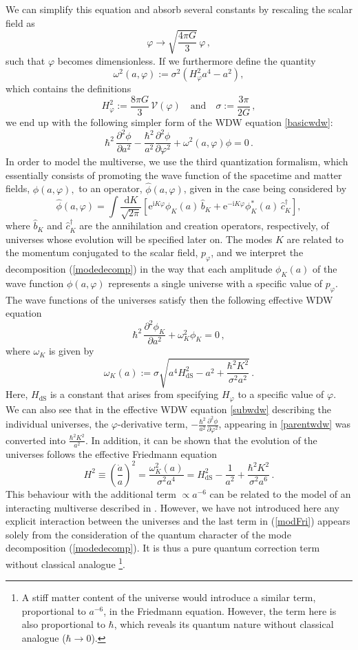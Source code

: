\documentclass[aps,nofootinbib,prd,superscriptaddress,eqsecnum,showpacs,showkeys,preprintnumbers,altaffilletter]{revtex4}
\def\D{\mathrm{d}}
\def\I{\mathrm{i}}
\def\E{\mathrm{e}}
\def\del{\partial}
\def\be{\begin{equation}}
\def\ee{\end{equation}}
\newcommand{\HdS}{H_\mathrm{dS}}
\begin{document}
We can simplify this equation and absorb several constants by rescaling the scalar field as 
\be
\varphi \rightarrow \sqrt{\frac{4\pi G}{3}} \,\varphi\,,
\ee
such that $\varphi$ becomes dimensionless. If we furthermore define the quantity
\be
\omega^2(a,\varphi) := \sigma^2 \left(H_\varphi^2 a^4 - a^2\right),
\ee
which contains the definitions
\be
\label{sigma_def}
H_\varphi^2 := \frac{8 \pi G}{3}\,\mathcal{V}(\varphi) \quad \text{and} \quad \sigma := \frac{3 \pi}{2 G}\,,
\ee
we end up with the following simpler form of the WDW equation \eqref{basicwdw}:
\be
\label{parentwdw}
\hbar^2\,\frac{\del^2\phi}{\del a^2} - \frac{\hbar^2}{a^2} \frac{\del^2 \phi}{\del \varphi^2} + \omega^2(a,\varphi) \phi = 0\,.
\ee
In order to model the multiverse, we use the third quantization formalism, which essentially consists of promoting the wave function of the spacetime and matter fields, $\phi(a,\varphi), $ to an operator, $\hat{\phi}(a,\varphi) $, given in the case being considered by 
\be\label{modedecomp}
\hat{\phi}(a,\varphi) = \int \frac{\D K}{\sqrt{2\pi}} 
\left[\E^{\I K \varphi} \phi_K(a) \, \hat{b}_{K} + \E^{-\I K \varphi} \phi_K^*(a) \, \hat{c}^\dag_{K}\right],
\ee
where $\hat{b}_{K}$ and $\hat{c}^\dag_{K}$ are the annihilation and creation operators, respectively, of universes whose evolution will be specified later on. The modes $K$ are related to the momentum conjugated to the scalar field, $p_\varphi$, and we interpret the decomposition (\ref{modedecomp}) in the way that each amplitude $\phi_K(a)$ of the  wave function $\phi(a,\varphi)$ represents a single universe with a specific value of $p_\varphi$. The wave functions of the universes satisfy then the following effective WDW equation
\be \label{subwdw}
\hbar^2\,\frac{\del^2\phi_K}{\del a^2} + \omega_K^2 \phi_K = 0\,,
\ee
where $\omega_K$ is given by
\be \label{omk}
\omega_K(a) := \sigma \sqrt{a^4 \HdS^2 - a^2 + \frac{\hbar^2 K^2}{\sigma^2 a^2}}\,.
\ee
Here, $\HdS$ is a constant that arises from specifying $H_\varphi$ to a specific value of $\varphi$. We can also see that in the effective WDW equation \eqref{subwdw} describing the individual universes, the $\varphi$-derivative term, $- \frac{\hbar^2}{a^2} \frac{\del^2 \phi}{\del \varphi^2}$, appearing in \eqref{parentwdw} was converted into $\frac{\hbar^2 K^2}{a^2}$. In addition, it can be shown that the evolution of the universes follows the effective Friedmann equation \cite{salva2011,Garay:2013pba}
\be \label{modFri}
H^2 \equiv \left(\frac{\dot a}{a}\right)^2 = \frac{\omega^2_K(a)}{\sigma^2a^4} = \HdS^2 - \frac{1}{a^2} + \frac{\hbar^2 K^2}{\sigma^2 a^6}\,.
\ee
This behaviour with the additional term $\propto a^{-6}$ can be related to the model of an interacting multiverse described in \cite{salva2015}. However, we have not introduced here any explicit interaction between the universes and the last term in (\ref{modFri}) appears solely from the consideration of the quantum character of the mode decomposition (\ref{modedecomp}). It is thus a pure quantum correction term {without classical analogue%
\footnote{A stiff matter content of the universe would introduce a similar term, proportional to $a^{-6}$, in the Friedmann equation. However, the term here is also proportional to $\hbar$, which reveals its quantum nature without classical analogue ($\hbar\rightarrow 0$).}.}
\end{document}
